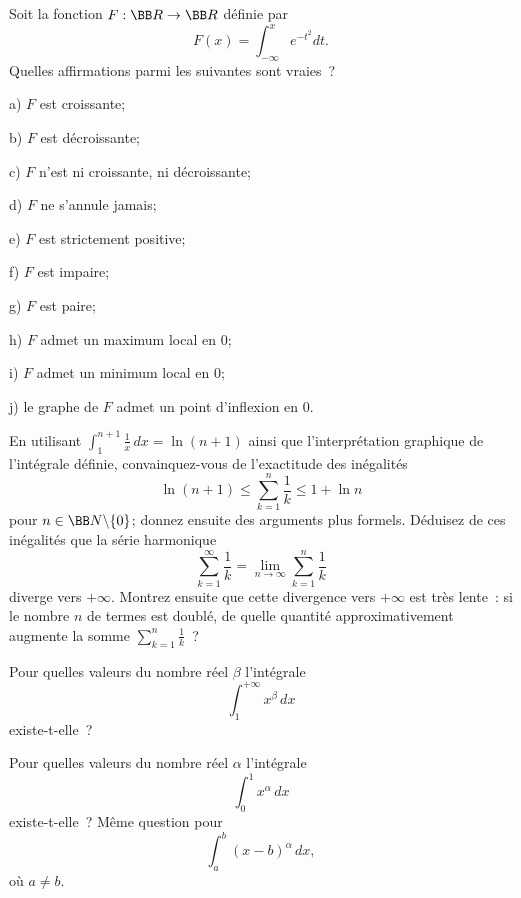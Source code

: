 \documentclass[12pt,french,oneside,a4paper]{memoir} %
\begin{document}
\begin{exo}
Soit la fonction $F:{\BB R}\rightarrow{\BB R}$ définie par
\begin{equation*}
F(x)=\int^x_{-\infty}e^{-t^2}dt.
\end{equation*}
Quelles affirmations parmi les suivantes sont vraies~?

a) $F$ est croissante;

b) $F$ est décroissante;

c) $F$ n'est ni croissante, ni décroissante;

d) $F$ ne s'annule jamais;

e) $F$ est strictement positive;

f) $F$ est impaire;

g) $F$ est paire;

h) $F$ admet un maximum local en $0$;

i) $F$ admet un minimum local en $0$;

j) le graphe de $F$ admet un point d'inflexion en $0$.
\end{exo}
\begin{exo}
En utilisant
$\displaystyle{\int^{n+1}_1\frac{1}{x}\,dx=\ln(n+1)}$ ainsi
que l'interprétation graphique de l'intégrale définie,
convainquez-vous de l'exactitude des inégalités
\begin{equation*}
\ln(n+1)\leq\sum^n_{k=1}\frac{1}{k}\leq1+\ln n
\end{equation*}
pour $n\in\BB N\backslash\{0\}$; donnez ensuite des arguments plus
formels. Déduisez de ces inégalités que la série harmonique
\begin{equation*}
\sum^\infty_{k=1}\frac{1}{k}=\lim_{n\rightarrow\infty}
\sum^n_{k=1}\frac{1}{k}
\end{equation*}
diverge vers $+\infty$. Montrez ensuite que cette divergence vers
$+\infty$ est très lente~: si le nombre $n$ de termes est
doublé, de quelle quantité approximativement augmente la somme
$\displaystyle{\sum^n_{k=1}\frac{1}{k}}$~?
\end{exo}
\begin{exo}
Pour quelles valeurs du nombre réel $\beta$ l'intégrale
\begin{equation*}
\int^{+\infty}_1x^\beta\,dx
\end{equation*}
existe-t-elle~?
\end{exo}
\begin{exo}
Pour quelles valeurs du nombre réel $\alpha$ l'intégrale
\begin{equation*}
\int^1_0x^\alpha\,dx
\end{equation*}
existe-t-elle~? Même question  pour 
\begin{equation*}
\int^b_a(x-b)^\alpha\,dx,
\end{equation*}
où $a\neq b$.
\end{exo}
\end{document}
